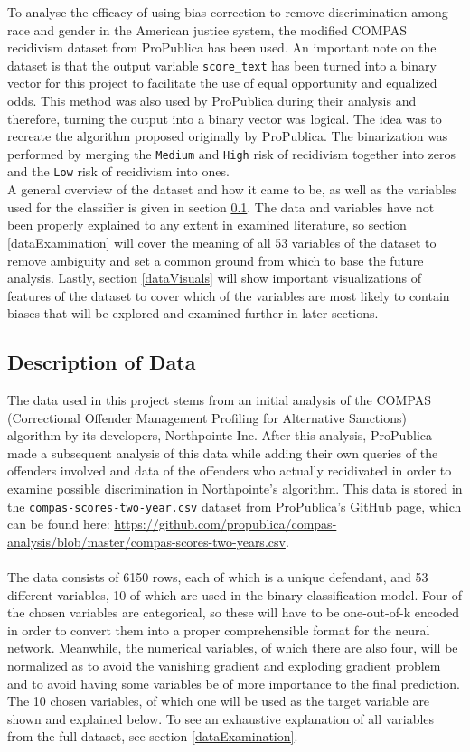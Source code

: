 \documentclass[11pt, fleqn, titlepage]{article}
\begin{document}
	\noindent To analyse the efficacy of using bias correction to remove discrimination among race and gender in the American justice system, the modified COMPAS recidivism dataset from ProPublica has been used. An important note on the dataset is that the output variable \texttt{score\_text} has been turned into a binary vector for this project to facilitate the use of equal opportunity and equalized odds. This method was also used by ProPublica during their analysis and therefore, turning the output into a binary vector was logical. The idea was to recreate the algorithm proposed originally by ProPublica. The binarization was performed by merging the \texttt{Medium} and \texttt{High} risk of recidivism together into zeros and the \texttt{Low} risk of recidivism into ones. \\
	A general overview of the dataset and how it came to be, as well as the variables used for the classifier is given in section \ref{dataDescription}. The data and variables have not been properly explained to any extent in examined literature, so section \ref{dataExamination} will cover the meaning of all 53 variables of the dataset to remove ambiguity and set a common ground from which to base the future analysis. Lastly, section \ref{dataVisuals} will show important visualizations of features of the dataset to cover which of the variables are most likely to contain biases that will be explored and examined further in later sections.
	
	\subsection{Description of Data} \label{dataDescription}
	The data used in this project stems from an initial analysis of the COMPAS (Correctional Offender Management Profiling for Alternative Sanctions) algorithm by its developers, Northpointe Inc. After this analysis, ProPublica made a subsequent analysis of this data while adding their own queries of the offenders involved and data of the offenders who actually recidivated in order to examine possible discrimination in Northpointe's algorithm. This data is stored in the \texttt{compas-scores-two-year.csv} dataset from ProPublica's GitHub page, which can be found here: \url{https://github.com/propublica/compas-analysis/blob/master/compas-scores-two-years.csv}. \\\\
	\noindent The data consists of 6150 rows, each of which is a unique defendant, and 53 different variables, 10 of which are used in the binary classification model. Four of the chosen variables are categorical, so these will have to be one-out-of-k encoded in order to convert them into a proper comprehensible format for the neural network. Meanwhile, the numerical variables, of which there are also four, will be normalized as to avoid the vanishing gradient and exploding gradient problem and to avoid having some variables be of more importance to the final prediction.
	The 10 chosen variables, of which one will be used as the target variable are shown and explained below. To see an exhaustive explanation of all variables from the full dataset, see section \ref{dataExamination}.
	
\end{document}
